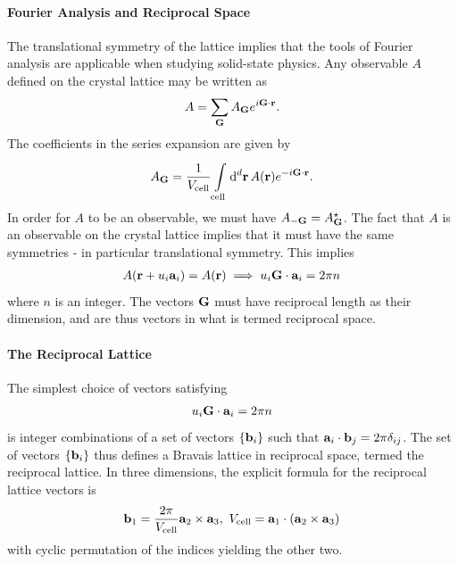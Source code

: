 \paragraph{Fourier Analysis and Reciprocal Space}
The translational symmetry of the lattice implies that the tools of Fourier analysis are applicable when studying solid-state physics. Any observable $A$ defined on the crystal lattice may be written as
\begin{align*}
	A = \sum\limits_{\vb{G}}A_{\vb{G}}e^{i\vb{G}\cdot\vb{r}}.
\end{align*}
The coefficients in the series expansion are given by
\begin{align*}
	A_{\vb{G}} = \frac{1}{V_{\text{cell}}}\integ[d]{\text{cell}}{}{\vb{r}}{A(\vb{r})e^{-i\vb{G}\cdot\vb{r}}}.
\end{align*}
In order for $A$ to be an observable, we must have $A_{-\vb{G}} = \cc{A_{\vb{G}}}$. The fact that $A$ is an observable on the crystal lattice implies that it must have the same symmetries - in particular translational symmetry. This implies
\begin{align*}
	A(\vb{r} + u_{i}\vb{a}_{i}) = A(\vb{r}) \implies u_{i}\vb{G}\cdot\vb{a}_{i} = 2\pi n
\end{align*}
where $n$ is an integer. The vectors $\vb{G}$ must have reciprocal length as their dimension, and are thus vectors in what is termed reciprocal space.

\paragraph{The Reciprocal Lattice}
The simplest choice of vectors satisfying
\begin{align*}
	u_{i}\vb{G}\cdot\vb{a}_{i} = 2\pi n
\end{align*}
is integer combinations of a set of vectors $\{\vb{b}_{i}\}$ such that $\vb{a}_{i}\cdot\vb{b}_{j} = 2\pi\delta_{ij}$. The set of vectors $\{\vb{b}_{i}\}$ thus defines a Bravais lattice in reciprocal space, termed the reciprocal lattice. In three dimensions, the explicit formula for the reciprocal lattice vectors is
\begin{align*}
	\vb{b}_{1} = \frac{2\pi}{V_{\text{cell}}}\vb{a}_{2}\times\vb{a}_{3},\ V_{\text{cell}} = \vb{a}_{1}\cdot(\vb{a}_{2}\times\vb{a}_{3})
\end{align*}
with cyclic permutation of the indices yielding the other two.

